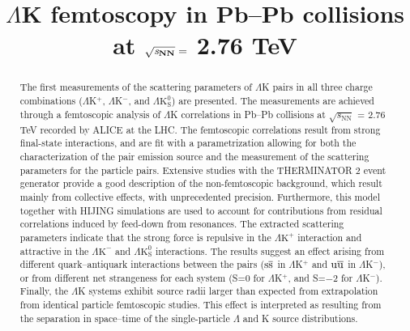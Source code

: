 \documentclass[ALICE,manyauthors]{cernphprep}
\newcommand{\LamK}{$\Lambda$K\xspace}
\newcommand{\LamKchP}{$\Lambda\mathrm{K^{+}}$\xspace}
\newcommand{\LamKchM}{$\Lambda\mathrm{K^{-}}$\xspace}
\newcommand{\LamKs}{$\Lambda\mathrm{K^{0}_{S}}$\xspace}
\begin{document}
%

\begin{titlepage}
%
%

\title{\LamK femtoscopy in Pb--Pb collisions at $\mathbf{\sqrt{{\textit s}_{NN}}} =$ 2.76 TeV}
\ShortTitle{\LamK femtoscopy in Pb--Pb collisions}   %


\begin{abstract}
The first measurements of the scattering parameters of $\Lambda$K pairs in all three charge combinations ($\Lambda$K$^{+}$, $\Lambda$K$^{-}$, and $\Lambda\mathrm{K^{0}_{S}}$) are presented.
The measurements are achieved through a femtoscopic analysis of $\Lambda$K correlations in Pb--Pb collisions at $\sqrt{s_{\mathrm{NN}}}$ = 2.76 TeV recorded by ALICE at the LHC.  
The femtoscopic correlations result from strong final-state interactions, and are fit with a parametrization allowing for both the characterization of the pair emission source and the measurement of the scattering parameters for the particle pairs.
Extensive studies with the THERMINATOR 2 event generator provide a good description of the non-femtoscopic background, which result mainly from collective effects, with unprecedented precision.
Furthermore, this model together with HIJING simulations are used to account for contributions from residual correlations induced by feed-down from resonances.
The extracted scattering parameters indicate that the strong force is repulsive in the \LamKchP interaction and attractive in the \LamKchM and \LamKs interactions.
The results suggest an effect arising from different quark--antiquark interactions between the pairs ($\rm s\overline{s}$ in $\Lambda$K$^{+}$ and $\rm u\overline{u}$ in $\Lambda$K$^{-}$), or from different net strangeness for each system (S=0 for $\Lambda$K$^{+}$, and S=$-2$ for $\Lambda$K$^{-}$).
Finally, the $\Lambda$K systems exhibit source radii larger than expected from extrapolation from identical particle femtoscopic studies.
This effect is interpreted as resulting from the separation in space--time of the single-particle $\Lambda$ and K source distributions.
\end{abstract}
\end{titlepage}
\setcounter{page}{2}
\end{document}
